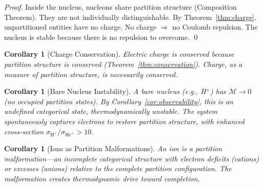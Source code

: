 \documentclass[twocolumn,10pt,a4paper]{article}
\newtheorem{corollary}[theorem]{Corollary}
\theoremstyle{definition}
\theoremstyle{remark}
\newcommand{\Depth}{\mathcal{M}}
\begin{document}
\begin{proof}
Inside the nucleus, nucleons share partition structure (Composition Theorem). They are not individually distinguishable. By Theorem~\ref{thm:charge}, unpartitioned entities have no charge. No charge $\Rightarrow$ no Coulomb repulsion. The nucleus is stable because there is no repulsion to overcome. \qed
\end{proof}

\begin{corollary}[Charge Conservation]
\label{cor:charge-conservation}
Electric charge is conserved because partition structure is conserved (Theorem~\ref{thm:conservation}). Charge, as a measure of partition structure, is necessarily conserved.
\end{corollary}

\begin{corollary}[Bare Nucleus Instability]
\label{cor:bare-nucleus}
A bare nucleus (e.g., H$^+$) has $\Depth \to 0$ (no occupied partition states). By Corollary~\ref{cor:observability}, this is an undefined categorical state, thermodynamically unstable. The system spontaneously captures electrons to restore partition structure, with enhanced cross-section $\sigma_{\text{H}^+}/\sigma_{\text{He}^+} > 10$.
\end{corollary}

\begin{corollary}[Ions as Partition Malformations]
\label{cor:ions}
An ion is a partition malformation---an incomplete categorical structure with electron deficits (cations) or excesses (anions) relative to the complete partition configuration. The malformation creates thermodynamic drive toward completion.
\end{corollary}
\end{document}
